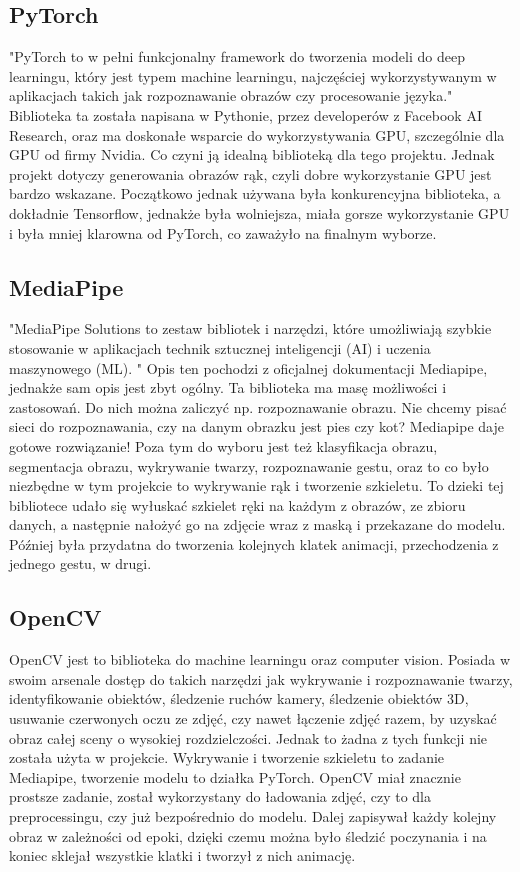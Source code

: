 \documentclass[12pt]{article}
\begin{document}
\begin{sloppypar}
{  \subsection{PyTorch}
  {
    "PyTorch to w pełni funkcjonalny framework do tworzenia modeli do deep learningu, który jest typem machine learningu, najczęściej wykorzystywanym w aplikacjach takich jak
    rozpoznawanie obrazów czy procesowanie języka."\cite{pytorch-nvidia} 
    Biblioteka ta została napisana w Pythonie, przez developerów z Facebook AI Research, oraz ma doskonałe wsparcie do wykorzystywania GPU, szczególnie dla GPU od firmy Nvidia.
    Co czyni ją idealną biblioteką dla tego projektu. Jednak projekt dotyczy generowania obrazów rąk, czyli dobre wykorzystanie GPU jest bardzo wskazane.
    Początkowo jednak używana była konkurencyjna biblioteka, a dokładnie Tensorflow, jednakże była wolniejsza, miała gorsze wykorzystanie GPU i była mniej klarowna od PyTorch, co zaważyło na finalnym wyborze.
  }
  \subsection{MediaPipe}
  {
    "MediaPipe Solutions to zestaw bibliotek i narzędzi, które umożliwiają szybkie stosowanie w aplikacjach technik sztucznej inteligencji (AI) i uczenia maszynowego (ML). "\cite{mediapipe}
    Opis ten pochodzi z oficjalnej dokumentacji Mediapipe, jednakże sam opis jest zbyt ogólny. 
    Ta biblioteka ma masę możliwości i zastosowań. Do nich można zaliczyć np. rozpoznawanie obrazu. Nie chcemy pisać sieci do rozpoznawania, czy na danym obrazku jest pies czy kot? Mediapipe daje gotowe rozwiązanie!
    Poza tym do wyboru jest też klasyfikacja obrazu, segmentacja obrazu, wykrywanie twarzy, rozpoznawanie gestu, oraz to co było niezbędne w tym projekcie to wykrywanie rąk i tworzenie szkieletu.
    To dzieki tej bibliotece udało się wyłuskać szkielet ręki na każdym z obrazów, ze zbioru danych, a następnie nałożyć go na zdjęcie wraz z maską i przekazane do modelu. 
    Później była przydatna do tworzenia kolejnych klatek animacji, przechodzenia z jednego gestu, w drugi.
  }
  \subsection{OpenCV}
  {
    OpenCV jest to biblioteka do machine learningu oraz computer vision. Posiada w swoim arsenale dostęp do takich narzędzi jak wykrywanie i rozpoznawanie twarzy,
    identyfikowanie obiektów, śledzenie ruchów kamery, śledzenie obiektów 3D, usuwanie czerwonych oczu ze zdjęć, czy nawet łączenie zdjęć razem, by uzyskać obraz całej sceny o wysokiej rozdzielczości.\cite{opencv}
    Jednak to żadna z tych funkcji nie została użyta w projekcie. 
    Wykrywanie i tworzenie szkieletu to zadanie Mediapipe, tworzenie modelu to działka PyTorch. 
    OpenCV miał znacznie prostsze zadanie, został wykorzystany do ładowania zdjęć, czy to dla preprocessingu, czy już bezpośrednio do modelu.
    Dalej zapisywał każdy kolejny obraz w zależności od epoki, dzięki czemu można było śledzić poczynania i na koniec sklejał wszystkie klatki i tworzył z nich animację.
  }
}


\end{sloppypar}
\end{document}
